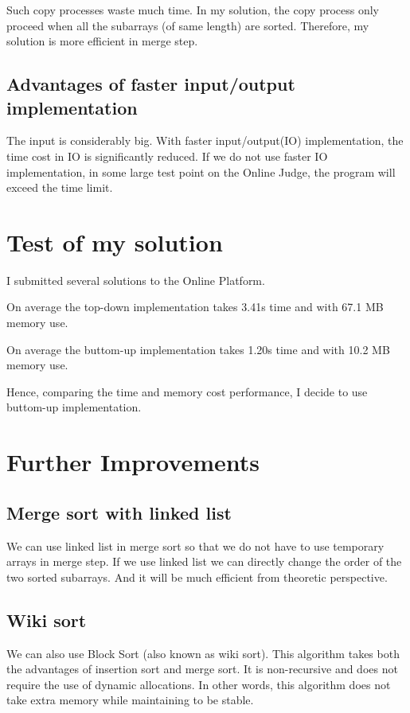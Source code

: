 \documentclass{report}
\begin{document}
Such copy processes waste much time.
In my solution, the copy process only proceed when all the subarrays (of same length) are sorted.
Therefore, my solution is more efficient in merge step.

\subsection{Advantages of faster input/output implementation}

The input is considerably big.
With faster input/output(IO) implementation, the time cost in IO is significantly reduced.
If we do not use faster IO implementation, in some large test point on the Online Judge, the program will exceed the time limit.

\section{Test of my solution}

I submitted several solutions to the Online Platform.

\noindent
On average the top-down implementation takes 3.41s time and with 67.1 MB memory use.

\noindent
On average the buttom-up implementation takes 1.20s time and with 10.2 MB memory use.

\noindent
Hence, comparing the time and memory cost performance, I decide to use buttom-up implementation.

\section{Further Improvements}

\subsection{Merge sort with linked list}

We can use linked list in merge sort so that we do not have to use temporary arrays in merge step.
If we use linked list we can directly change the order of the two sorted subarrays.
And it will be much efficient from theoretic perspective.

\subsection{Wiki sort}

We can also use Block Sort (also known as wiki sort).
This algorithm takes both the advantages of insertion sort and merge sort.
It is non-recursive and does not require the use of dynamic allocations.
In other words, this algorithm does not take extra memory while maintaining to be stable.
\end{document}
